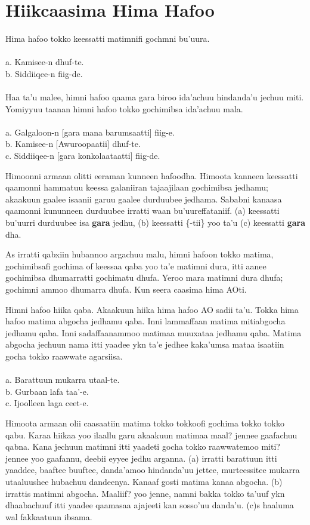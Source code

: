 \documentclass[11pt,b5paper]{book}
\begin{document}
\section{Hiikcaasima Hima Hafoo}
Hima hafoo tokko keessatti matimnifi gochmni bu’uura.\\
\\
a. Kamisee-n dhuf-te.\\
b. Siddiiqee-n fiig-de. \\
\\
Haa ta'u malee, himni hafoo qaama gara biroo ida’achuu hindanda’u jechuu miti.
Yomiyyuu taanan himni hafoo tokko gochimibsa ida’achuu mala. \\
\\
a. Galgaloon-n [gara mana barumsaatti] fiig-e.\\
b. Kamisee-n [Awuroopaatii] dhuf-te.\\
c. Siddiiqee-n [gara konkolaataatti] fiig-de. 

Himoonni armaan olitti eeraman kunneen hafoodha. Himoota kanneen keessatti qaamonni hammatuu keessa galaniiran tajaajilaan gochimibsa jedhamu; akaakuun gaalee isaanii garuu gaalee durduubee jedhama. Sababni kanaasa qaamonni kununneen durduubee irratti waan bu’uureffataniif. (a) keessatti bu’uurri durduubee isa \textbf{gara} jedhu, (b) keessatti \{-tii\} yoo ta’u (c) keessatti \textbf{gara} dha.

As irratti qabxiin hubannoo argachuu malu, himni hafoon tokko matima, gochimibsafi gochima of keessaa qaba yoo ta’e matimni dura, itti aanee gochimibsa dhumarratti gochimatu dhufa. Yeroo mara matimni dura dhufa; gochimni ammoo dhumarra dhufa. Kun seera caasima hima AOti.

Himni hafoo hiika qaba. Akaakuun hiika hima hafoo AO sadii ta’u. Tokka hima hafoo
matima abgocha jedhamu qaba. Inni lammaffaan matima mitiabgocha jedhamu qaba. Inni sadaffaanammoo matimaa muuxataa jedhamu qaba. Matima abgocha jechuun nama itti yaadee ykn ta’e jedhee kaka’umsa mataa isaatiin gocha tokko raawwate agarsiisa. \\
\\
a. Barattuun mukarra utaal-te.\\
b. Gurbaan lafa taa’-e.\\
c. Ijoolleen laga ceet-e.

Himoota armaan olii caasaatiin matima tokko tokkoofi gochima tokko tokko qabu. Karaa hiikaa yoo ilaallu garu akaakuun matimaa maal? jennee gaafachuu qabna. Kana jechuun matimni itti yaadeti gocha tokko raawwatemoo miti? jennee yoo gaafannu, deebii eyyee jedhu arganna. (a) irratti barattuun itti
yaaddee, baaftee buuftee, danda’amoo hindanda’uu jettee, murteessitee mukarra utaaluushee hubachuu dandeenya. Kanaaf gosti matima kanaa abgocha. (b) irrattis matimni abgocha. Maaliif? yoo jenne, namni bakka tokko ta’uuf ykn dhaabachuuf itti yaadee qaamasaa ajajeeti kan sosso’uu danda’u. (c)s haaluma wal fakkaatuun ibsama.
\end{document}
